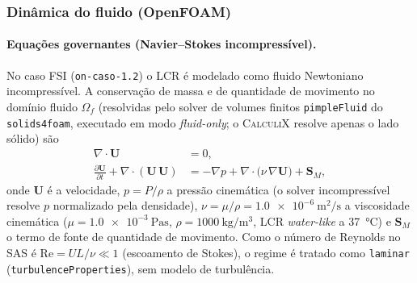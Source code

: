 \subsubsection*{Dinâmica do fluido (OpenFOAM)}
\label{sec:teoria-fluido}

\paragraph{Equações governantes (Navier--Stokes incompressível).} No caso FSI
(\texttt{on-caso-1.2}) o LCR é modelado como fluido Newtoniano incompressível. A
conservação de massa e de quantidade de movimento no domínio fluido $\Omega_f$
(resolvidas pelo solver de volumes finitos \texttt{pimpleFluid} do
\texttt{solids4foam}, executado em modo \emph{fluid-only}; o \textsc{CalculiX}
resolve apenas o lado sólido) são
\begin{align}
  \nabla\!\cdot\mathbf{U} &= 0,
  \label{eq:continuidade}\\[2pt]
  \frac{\partial \mathbf{U}}{\partial t}
  + \nabla\!\cdot(\mathbf{U}\,\mathbf{U})
  &= -\nabla p
  + \nabla\!\cdot\!\big(\nu\,\nabla\mathbf{U}\big)
  + \mathbf{S}_M,
  \label{eq:momento}
\end{align}
onde $\mathbf{U}$ é a velocidade, $p = P/\rho$ a pressão cinemática (o solver
incompressível resolve $p$ normalizado pela densidade),
$\nu = \mu/\rho = \SI{1.0e-6}{\square\meter\per\second}$ a viscosidade cinemática
($\mu = \SI{1.0e-3}{\pascal\second}$, $\rho = \SI{1000}{\kilogram\per\meter\cubed}$,
LCR \emph{water-like} a \SI{37}{\celsius}) e $\mathbf{S}_M$ o termo de fonte de
quantidade de movimento. Como o número de Reynolds no SAS é
$\mathrm{Re} = U L/\nu \ll 1$ (escoamento de Stokes), o regime é tratado como
\texttt{laminar} (\texttt{turbulenceProperties}), sem modelo de turbulência.

